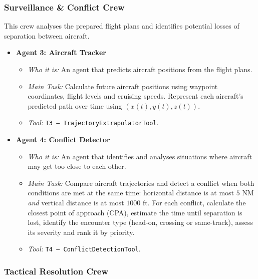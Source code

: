 \subsubsection{Surveillance \& Conflict Crew}

This crew analyses the prepared flight plans and identifies potential losses of separation between aircraft.

\begin{itemize}[leftmargin=*]

    \item \textbf{Agent 3: Aircraft Tracker}
    \begin{itemize}
        \item \textit{Who it is:} An agent that predicts aircraft positions from the flight plans.
        \item \textit{Main Task:} Calculate future aircraft positions using waypoint coordinates, flight levels and cruising speeds. Represent each aircraft's predicted path over time using $(x(t), y(t), z(t))$.
        \item \textit{Tool:} \texttt{T3 -- TrajectoryExtrapolatorTool}.
    \end{itemize}

    \item \textbf{Agent 4: Conflict Detector}
    \begin{itemize}
        \item \textit{Who it is:} An agent that identifies and analyses situations where aircraft may get too close to each other.
        \item \textit{Main Task:} Compare aircraft trajectories and detect a conflict when both conditions are met at the same time: horizontal distance is at most $5\text{ NM}$ \emph{and} vertical distance is at most $1000\text{ ft}$. For each conflict, calculate the closest point of approach (CPA), estimate the time until separation is lost, identify the encounter type (head-on, crossing or same-track), assess its severity and rank it by priority.
        \item \textit{Tool:} \texttt{T4 -- ConflictDetectionTool}.
    \end{itemize}

\end{itemize}


\subsubsection{Tactical Resolution Crew}

